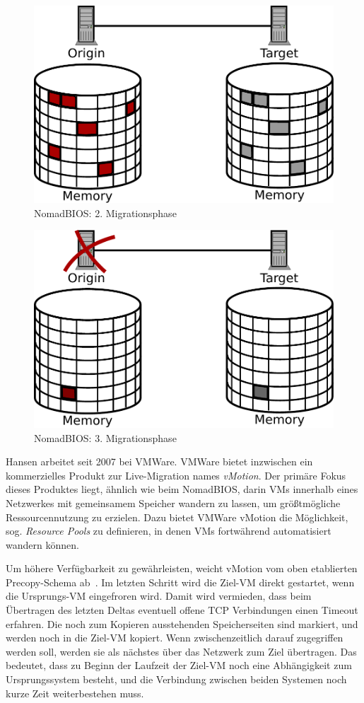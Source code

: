 \begin{figure}[t]
  \centering
  \includegraphics[width=0.7\linewidth]{images/nomad_stage2}
  \caption{NomadBIOS: 2. Migrationsphase}
  \label{fig:nomad_stage2}
\end{figure}
\begin{figure}[b]
  \centering
  \includegraphics[width=0.7\linewidth]{images/nomad_stage3}
  \caption{NomadBIOS: 3. Migrationsphase}
  \label{fig:nomad_stage3}
\end{figure}

Hansen arbeitet seit 2007 bei VMWare. VMWare bietet inzwischen ein
kommerzielles Produkt zur Live-Migration names \emph{vMotion}. Der
primäre Fokus dieses Produktes liegt, ähnlich wie beim NomadBIOS,
darin \acp{VM} innerhalb eines Netzwerkes mit gemeinsamem Speicher
wandern zu lassen, um größtmögliche Ressourcennutzung zu
erzielen. Dazu bietet VMWare vMotion die Möglichkeit,
sog. \emph{Resource Pools} zu definieren, in denen \acp{VM}
fortwährend automatisiert wandern können.

Um höhere Verfügbarkeit zu gewährleisten, weicht vMotion vom oben
etablierten Precopy-Schema ab~\cite{nelson2005fast}. Im letzten
Schritt wird die Ziel-\ac{VM} direkt gestartet, wenn die Ursprungs-\ac{VM}
eingefroren wird. Damit wird vermieden, dass beim Übertragen des
letzten Deltas eventuell offene TCP Verbindungen einen Timeout
erfahren. Die noch zum Kopieren ausstehenden Speicherseiten sind
markiert, und werden noch in die Ziel-\ac{VM} kopiert. Wenn
zwischenzeitlich darauf zugegriffen werden soll, werden sie als
nächstes über das Netzwerk zum Ziel übertragen. Das bedeutet, dass zu
Beginn der Laufzeit der Ziel-\ac{VM} noch eine Abhängigkeit zum
Ursprungssystem besteht, und die Verbindung zwischen beiden Systemen
noch kurze Zeit weiterbestehen muss.


